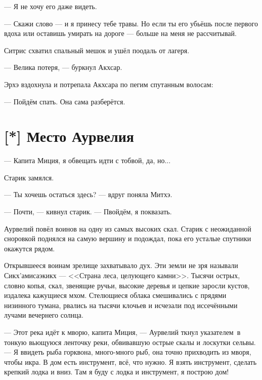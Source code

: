 --- Я не хочу его даже видеть.

--- Скажи слово --- и я принесу тебе травы.
Но если ты его убьёшь после первого вдоха или оставишь умирать на дороге --- больше на меня не рассчитывай.

Ситрис схватил спальный мешок и ушёл поодаль от лагеря.

--- Велика потеря, --- буркнул Акхсар.

Эрхэ вздохнула и потрепала Акхсара по пегим спутанным волосам:

--- Пойдём спать.
Она сама разберётся.

\section{[*] Место Аурвелия}

\textspace

--- Капита Миция, я обвещать идти с тобвой, да, но...

Старик замялся.

--- Ты хочешь остаться здесь? --- вдруг поняла Митхэ.

--- Почти, --- кивнул старик.
--- Пвойдём, я поквазать.

Аурвелий повёл воинов на одну из самых высоких скал.
Старик с неожиданной сноровкой поднялся на самую вершину и подождал, пока его усталые спутники окажутся рядом.

Открывшееся воинам зрелище захватывало дух.
Эти земли не зря называли Сикх'амисаэкикх --- <<Страна леса, целующего камни>>.
Тысячи острых, словно копья, скал, звенящие ручьи, высокие деревья и цепкие заросли кустов, издалека кажущиеся мхом.
Стелющиеся облака смешивались с прядями низинного тумана, рвались на тысячи клочьев и исчезали под иссечёнными лучами вечернего солнца.

--- Этот река идёт к мворю, капита Миция, --- Аурвелий ткнул указателем\FM\ в тонкую вьющуюся ленточку реки, обвивавшую острые скалы и лоскутки сельвы.
--- Я ввидеть рыба горквона, много-много рыб, она точно прихводить из мворя, чтобы икра.
В дом есть инструмент, всё, что нужно.
Я взять инструмент, сделать крепкий лодка и вниз.
Там я буду с лодка и инструмент, я построю дом!

